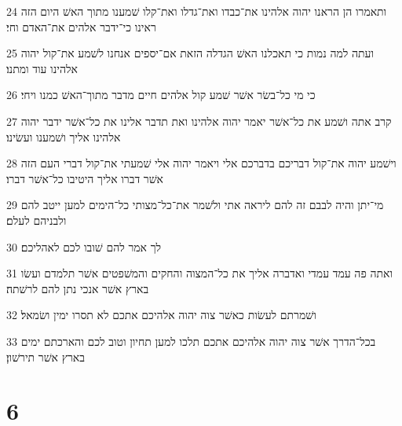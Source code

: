 \par 24 ותאמרו הן הראנו יהוה אלהינו את־כבדו ואת־גדלו ואת־קלו שׁמענו מתוך האשׁ היום הזה ראינו כי־ידבר אלהים את־האדם וחי׃
\par 25 ועתה למה נמות כי תאכלנו האשׁ הגדלה הזאת אם־יספים אנחנו לשׁמע את־קול יהוה אלהינו עוד ומתנו׃
\par 26 כי מי כל־בשׂר אשׁר שׁמע קול אלהים חיים מדבר מתוך־האשׁ כמנו ויחי׃
\par 27 קרב אתה ושׁמע את כל־אשׁר יאמר יהוה אלהינו ואת תדבר אלינו את כל־אשׁר ידבר יהוה אלהינו אליך ושׁמענו ועשׂינו׃
\par 28 וישׁמע יהוה את־קול דבריכם בדברכם אלי ויאמר יהוה אלי שׁמעתי את־קול דברי העם הזה אשׁר דברו אליך היטיבו כל־אשׁר דברו׃
\par 29 מי־יתן והיה לבבם זה להם ליראה אתי ולשׁמר את־כל־מצותי כל־הימים למען ייטב להם ולבניהם לעלם׃
\par 30 לך אמר להם שׁובו לכם לאהליכם׃
\par 31 ואתה פה עמד עמדי ואדברה אליך את כל־המצוה והחקים והמשׁפטים אשׁר תלמדם ועשׂו בארץ אשׁר אנכי נתן להם לרשׁתה׃
\par 32 ושׁמרתם לעשׂות כאשׁר צוה יהוה אלהיכם אתכם לא תסרו ימין ושׂמאל׃
\par 33 בכל־הדרך אשׁר צוה יהוה אלהיכם אתכם תלכו למען תחיון וטוב לכם והארכתם ימים בארץ אשׁר תירשׁון׃

\chapter{6}

